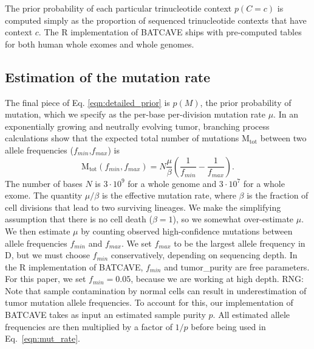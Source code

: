 \documentclass[a4,center,fleqn]{NAR}
\newcommand{\rngcomment}[1]{{\color{red}RNG: #1}}
\newcommand{\batcave}{BATCAVE\xspace}
\begin{document}
The prior probability of each particular trinucleotide context $p(C = c)$ is computed simply as the proportion of sequenced trinucleotide contexts that have context $c$.
The R implementation of \batcave ships with pre-computed tables for both human whole exomes and whole genomes.

\subsection{Estimation of the mutation rate}
The final piece of Eq. \ref{eqn:detailed_prior} is $p(M)$, the prior probability of mutation, which we specify as the per-base per-division mutation rate $\mu$.
In an exponentially growing and neutrally evolving tumor, branching process calculations \cite{Williams2018} show that the expected total number of mutations $\mathrm{M_{tot}}$ between two allele frequencies ($f_{min}$,$f_{max}$) is
\begin{equation}
  \label{eqn:mut_rate}
  \mathrm{M_{tot}}(f_{min},f_{max}) = N\frac{\mu}{\beta}\left(\frac{1}{f_{min}} - \frac{1}{f_{max}}\right).
\end{equation}
The number of bases $N$ is $3\cdot10^9$ for a whole genome and $3\cdot10^7$ for a whole exome.
The quantity $\mu/\beta$ is the effective mutation rate, where $\beta$ is the fraction of cell divisions that lead to two surviving lineages.
We make the simplifying assumption that there is no cell death ($\beta = 1$), so we somewhat over-estimate $\mu$.
We then estimate $\mu$ by counting observed high-confidence mutations between allele frequencies $f_{min}$ and $f_{max}$.
We set $f_{max}$ to be the largest allele frequency in $\mathrm{D}$, but we must choose $f_{min}$ conservatively, depending on sequencing depth.
In the R implementation of \batcave, $f_{min}$ and tumor_purity are free parameters.
For this paper, we set $f_{min} = 0.05$, because we are working at high depth.
\rngcomment{Note that sample contamination by normal cells can result in underestimation of tumor mutation allele frequencies.
To account for this, our implementation of BATCAVE takes as input an estimated sample purity $p$.
All estimated allele frequencies are then multiplied by a factor of $1/p$ before being used in Eq.~\ref{eqn:mut_rate}.
}

\end{document}
